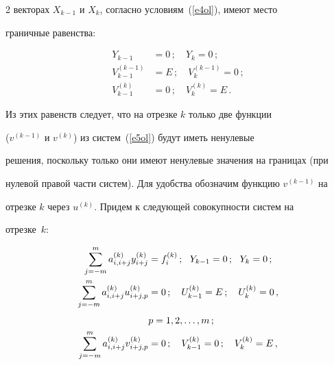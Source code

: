 \begin{multicols}{2}
векторах $X_{k-1}$ и $X_k$, согласно условиям~(\ref{e4ol}), имеют место


граничные равенства:


     \begin{align*}


     Y_{k-1} & =0\,;\quad Y_k=0\,;\\[4pt]


     V_{k-1}^{(k-1)} & =E\,;\quad V_k^{(k-1)} =0\,;\\[4pt]


     V_{k-1}^{(k)} & =0\,;\quad V_k^{(k)} =E\,.


     \end{align*}





     Из этих равенств следует, что на отрезке $k$ только две функции


     ($v^{(k-1)}$ и $v^{(k)}$) из систем~(\ref{e5ol}) будут иметь ненулевые


решения, поскольку только они имеют ненулевые значения на границах (при


нулевой правой части систем). Для удобства обозначим функцию $v^{(k-1)}$ на


отрезке $k$ через $u^{(k)}$. Придем к следующей совокупности систем на


отрезке~$k$:


     \begin{align}


     \sum\limits_{j=-m}^m a^{(k)}_{i,i+j} y^{(k)}_{i+j} & = f_i^{(k)}\,;\ \


Y_{k-1} =0\,;\ \ Y_k=0\,;\label{e6ol}\\


     \sum\limits_{j=-m}^m a^{(k)}_{i,i+j} u_{i+j,p}^{(k)} & = 0\,;\quad


U^{(k)}_{k-1} =E\,;\quad U_k^{(k)} =0\,,\notag\\[-6pt]


&\label{e7ol}\\[-6pt]


& p=1, 2, \ldots , m\,;\notag\\


     \sum\limits_{j=-m}^m a_{i,i+j}^{(k)}v^{(k)}_{i+j, p} & =0\,;\quad


V^{(k)}_{k-1} =0\,;\quad V_k^{(k)} =E\,,\notag\\[-6pt]


&\label{e8ol}\\[-6pt]



\end{align}
\end{multicols}
